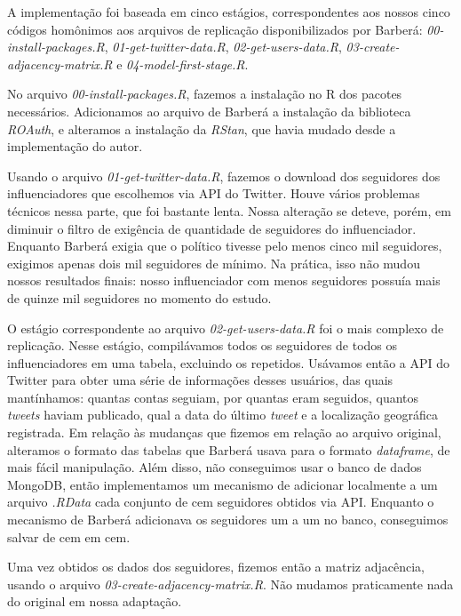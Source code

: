 \documentclass[
	12pt,				%
	openright,			%
	twoside,			%
	a4paper,			%
	english,			%
	brazil				%
	]{abntex2}
\begin{document}
\begin{anexosenv}
 A implementação foi baseada em cinco estágios, correspondentes aos nossos cinco códigos homônimos aos arquivos de replicação disponibilizados por Barberá: \textit{00-install-packages.R}, \textit{01-get-twitter-data.R}, \textit{02-get-users-data.R}, \textit{03-create-adjacency-matrix.R} e \textit{04-model-first-stage.R}.
 
 No arquivo \textit{00-install-packages.R}, fazemos a instalação no R dos pacotes necessários. Adicionamos ao arquivo de Barberá a instalação da biblioteca \textit{ROAuth}, e alteramos a instalação da \textit{RStan}, que havia mudado desde a implementação do autor.
 
 Usando o arquivo \textit{01-get-twitter-data.R}, fazemos o download dos seguidores dos influenciadores que escolhemos via API do Twitter. Houve vários problemas técnicos nessa parte, que foi bastante lenta. Nossa alteração se deteve, porém, em diminuir o filtro de exigência de quantidade de seguidores do influenciador. Enquanto Barberá exigia que o político tivesse pelo menos cinco mil seguidores, exigimos apenas dois mil seguidores de mínimo. Na prática, isso não mudou nossos resultados finais: nosso influenciador com menos seguidores possuía mais de quinze mil seguidores no momento do estudo.
 
 O estágio correspondente ao arquivo \textit{02-get-users-data.R} foi o mais complexo de replicação. Nesse estágio, compilávamos todos os seguidores de todos os influenciadores em uma tabela, excluindo os repetidos. Usávamos então a API do Twitter para obter uma série de informações desses usuários, das quais mantínhamos: quantas contas seguiam, por quantas eram seguidos, quantos \textit{tweets} haviam publicado, qual a data do último \textit{tweet} e a localização geográfica registrada. Em relação às mudanças que fizemos em relação ao arquivo original, alteramos o formato das tabelas que Barberá usava para o formato \textit{dataframe}, de mais fácil manipulação. Além disso, não conseguimos usar o banco de dados MongoDB, então implementamos um mecanismo de adicionar localmente a um arquivo \textit{.RData} cada conjunto de cem seguidores obtidos via API. Enquanto o mecanismo de Barberá adicionava os seguidores um a um no banco, conseguimos salvar de cem em cem.
 
 Uma vez obtidos os dados dos seguidores, fizemos então a matriz adjacência, usando o arquivo \textit{03-create-adjacency-matrix.R}. Não mudamos praticamente nada do original em nossa adaptação.
 

\end{anexosenv}
\end{document}
